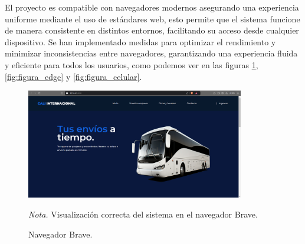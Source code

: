 El proyecto es compatible con navegadores modernos asegurando una experiencia uniforme mediante el uso de estándares web, esto permite que el sistema funcione de manera consistente en distintos entornos, facilitando su acceso desde cualquier dispositivo. Se han implementado medidas para optimizar el rendimiento y minimizar inconsistencias entre navegadores, garantizando una experiencia fluida y eficiente para todos los usuarios, como podemos ver en las figuras \ref{fig:figura_brave}, \ref{fig:figura_edge} y \ref{fig:figura_celular}.

\vspace{3cm} %

\begin{figure}[!h] %
	\caption[Navegador Brave]
	{\newline Navegador Brave.} %
	\centering
	\includegraphics[width=0.85\textwidth]{imagenes/cap_3/brave.png} %
	\begin{flushleft}
		\hspace{1.20cm} \textit{Nota.} Visualización correcta del sistema en el navegador Brave. %
	\end{flushleft}
	\vspace{-16pt}
	\label{fig:figura_brave} %
\end{figure}


